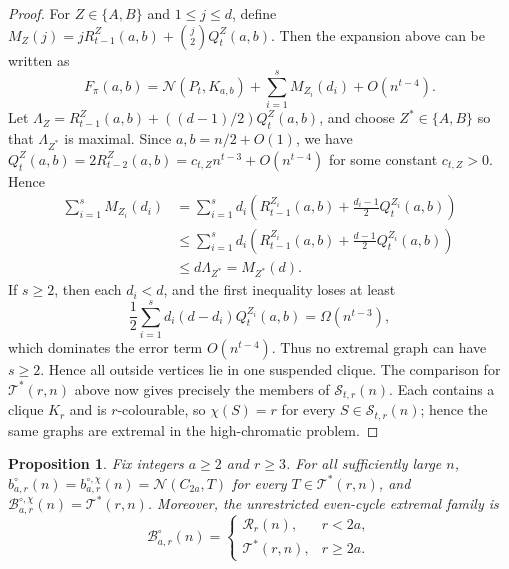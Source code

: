 \documentclass[11pt]{article}
\newtheorem{proposition}[theorem]{Proposition}
\theoremstyle{definition}
\theoremstyle{plain}
\theoremstyle{remark}
\theoremstyle{plain}
\numberwithin{equation}{section}
\newcommand{\cB}{\mathcal B}
\newcommand{\cS}{\mathcal S}
\newcommand{\cT}{\mathcal T}
\newcommand{\cR}{\mathcal R}
\newcommand{\N}{\mathcal N}
\begin{document}
\begin{proof}
For $Z\in\{A,B\}$ and $1\le j\le d$, define $M_Z(j)=jR_{t-1}^Z(a,b)+\binom j2 Q_t^Z(a,b)$.
Then the expansion above can be written as
\[
        F_\pi(a,b)=\N(P_t,K_{a,b})+\sum_{i=1}^s M_{Z_i}(d_i)+O(n^{t-4}).
\]
Let $\Lambda_Z=R_{t-1}^Z(a,b)+((d-1)/2)Q_t^Z(a,b)$, and choose $Z^*\in\{A,B\}$ so that $\Lambda_{Z^*}$ is maximal. Since $a,b=n/2+O(1)$, we have $Q_t^Z(a,b)=2R_{t-2}^Z(a,b)=c_{t,Z}n^{t-3}+O(n^{t-4})$ for some constant $c_{t,Z}>0$. Hence
\[
\begin{aligned}
        \sum_{i=1}^s M_{Z_i}(d_i)
        &=\sum_{i=1}^s d_i\left(R_{t-1}^{Z_i}(a,b)+\frac{d_i-1}{2}Q_t^{Z_i}(a,b)\right)\\
        &\le \sum_{i=1}^s d_i\left(R_{t-1}^{Z_i}(a,b)+\frac{d-1}{2}Q_t^{Z_i}(a,b)\right)\\
        &\le d\Lambda_{Z^*}=M_{Z^*}(d).
\end{aligned}
\]
If $s\ge2$, then each $d_i<d$, and the first inequality loses at least
\[
        \frac12\sum_{i=1}^s d_i(d-d_i)Q_t^{Z_i}(a,b)=\Omega(n^{t-3}),
\]
which dominates the error term $O(n^{t-4})$. Thus no extremal graph can have $s\ge2$. Hence all outside vertices lie in one suspended clique. The comparison for $\cT^*(r,n)$ above now gives precisely the members of $\cS_{t,r}(n)$. Each contains a clique $K_r$ and is $r$-colourable, so $\chi(S)=r$ for every $S\in\cS_{t,r}(n)$; hence the same graphs are extremal in the high-chromatic problem.
\end{proof}

\begin{proposition}\label{prop:cycle-extremal}
Fix integers $a\ge2$ and $r\ge3$. For all sufficiently large $n$, $b^{\circ}_{a,r}(n)=b^{\circ,\chi}_{a,r}(n)=\N(C_{2a},T)$ for every $T\in \cT^*(r,n)$, and $\cB^{\circ,\chi}_{a,r}(n)=\cT^*(r,n)$.
Moreover, the unrestricted even-cycle extremal family is
\[
        \cB^{\circ}_{a,r}(n)=
        \begin{cases}
        \cR_r(n), & r<2a,\\
        \cT^*(r,n), & r\ge2a.
        \end{cases}
\]
\end{proposition}
\end{document}
